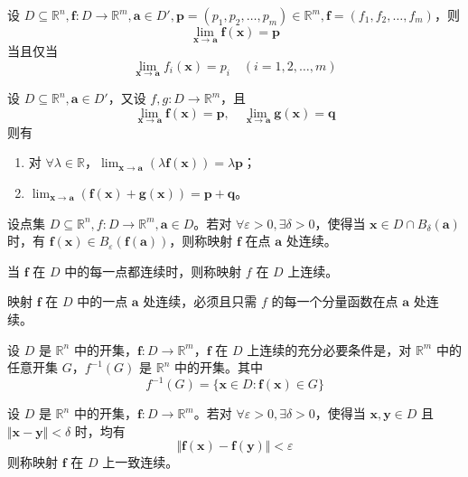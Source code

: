 \begin{theorem}
    设 $D \subseteq \mathbb{R}^n, \bm{f}: D \to \mathbb{R}^m, \bm{a} \in D', \bm{p} = (p_1, p_2, \ldots, p_m) \in \mathbb{R}^m, \bm{f} = (f_1, f_2, \ldots, f_m)$，则
    \[
        \lim_{\bm{x} \to \bm{a}}\bm{f}(\bm{x}) = \bm{p}
    \]
    当且仅当
    \[
        \lim_{\bm{x} \to \bm{a}}f_{i}(\bm{x}) = p_{i} \quad (i = 1, 2, \ldots, m)
    \]
\end{theorem}

\begin{theorem}
    设 $D \subseteq \mathbb{R}^n, \bm{a} \in D'$，又设 $f, g: D \to \mathbb{R}^m$，且
    \[
        \lim_{\bm{x} \to \bm{a}}\bm{f}(\bm{x}) = \bm{p}, \quad \lim_{\bm{x} \to \bm{a}}\bm{g}(\bm{x}) = \bm{q}
    \]
    则有
    \begin{enumerate}
        \item 对 $\forall \lambda \in \mathbb{R}$，$\displaystyle \lim_{\bm{x} \to \bm{a}}(\lambda \bm{f}(\bm{x})) = \lambda \bm{p}$；
        \item $\displaystyle \lim_{\bm{x} \to \bm{a}}(\bm{f}(\bm{x}) + \bm{g}(\bm{x})) = \bm{p} + \bm{q}$。
    \end{enumerate}
\end{theorem}

\begin{definition}
    设点集 $D \subseteq \mathbb{R}^n, f: D \to \mathbb{R}^m, \bm{a} \in D$。若对 $\forall \varepsilon > 0, \exists \delta > 0$，使得当 $\bm{x} \in D \cap B_{\delta}(\bm{a})$ 时，有 $\bm{f}(\bm{x}) \in B_{\varepsilon}(\bm{f}(\bm{a}))$，则称映射 $\bm{f}$ 在点 $\bm{a}$ 处连续。

    当 $\bm{f}$ 在 $D$ 中的每一点都连续时，则称映射 $f$ 在 $D$ 上连续。
\end{definition}

\begin{remark}
    映射 $\bm{f}$ 在 $D$ 中的一点 $\bm{a}$ 处连续，必须且只需 $f$ 的每一个分量函数在点 $\bm{a}$ 处连续。
\end{remark}

\begin{theorem}
    设 $D$ 是 $\mathbb{R}^n$ 中的开集，$\bm{f}: D \to \mathbb{R}^m$，$\bm{f}$ 在 $D$ 上连续的充分必要条件是，对 $\mathbb{R}^m$ 中的任意开集 $G$，$f^{-1}(G)$ 是 $\mathbb{R}^n$ 中的开集。其中
    \[
        f^{-1}(G) = \{\bm{x} \in D: \bm{f}(\bm{x}) \in G\}
    \]
\end{theorem}

\begin{definition}
    设 $D$ 是 $\mathbb{R}^n$ 中的开集，$\bm{f}: D \to \mathbb{R}^m$。若对 $\forall \varepsilon > 0, \exists \delta > 0$，使得当 $\bm{x}, \bm{y} \in D$ 且 $\Vert \bm{x} - \bm{y} \Vert < \delta$ 时，均有
    \[
        \Vert \bm{f}(\bm{x}) - \bm{f}(\bm{y}) \Vert < \varepsilon
    \]
    则称映射 $\bm{f}$ 在 $D$ 上一致连续。
\end{definition}


